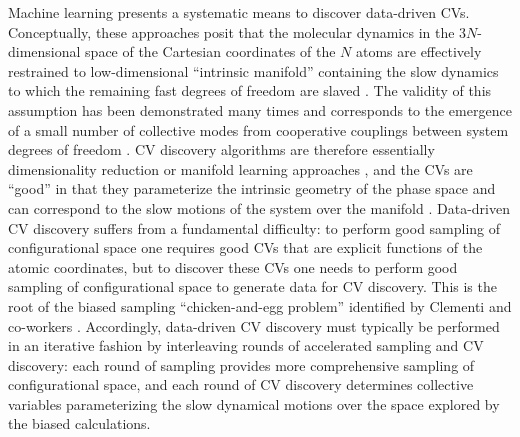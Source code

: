 \documentclass[12pt]{article}
\newcommand*{\blauwr}[1]{#1}
\begin{document}
Machine learning presents a systematic means to discover data-driven CVs. Conceptually, these approaches posit that the molecular dynamics in the 3$N$-dimensional space of the Cartesian coordinates of the $N$ atoms are effectively restrained to low-dimensional ``intrinsic manifold'' containing the slow dynamics to which the remaining fast degrees of freedom are slaved \cite{rohrdanz2013discovering,hegger2007complex}. The validity of this assumption has been demonstrated many times and corresponds to the emergence of a small number of collective modes from cooperative couplings between system degrees of freedom \cite{ferguson2011nonlinear,hegger2007complex,ferguson2010systematic,zhuravlev2009deconstructing,amadei1993essential,garcia1992large,das2006low,stamati2010application,ichiye1991collective}. CV discovery algorithms are therefore essentially dimensionality reduction or manifold learning approaches \cite{ferguson2011nonlinear, rohrdanz2013discovering}, and the CVs are ``good'' in that they \blauwr{parameterize the intrinsic geometry of the phase space and can correspond to the slow motions of the system over the manifold} \cite{ferguson2011nonlinear,ferguson2010systematic}. Data-driven CV discovery suffers from a fundamental difficulty: to perform good sampling of configurational space one requires good CVs that are explicit functions of the atomic coordinates, but to discover these CVs one needs to perform good sampling of configurational space to generate data for CV discovery. This is the root of the biased sampling ``chicken-and-egg problem'' identified by Clementi and co-workers \cite{rohrdanz2013discovering}. Accordingly, data-driven CV discovery must typically be performed in an iterative fashion by interleaving rounds of accelerated sampling and CV discovery: each round of sampling provides more comprehensive sampling of configurational space, and each round of CV discovery determines collective variables parameterizing the slow dynamical motions over the space explored by the biased calculations. 
\end{document}
